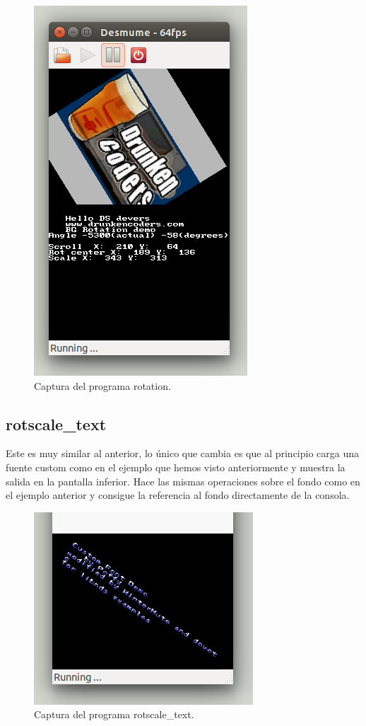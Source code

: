 \documentclass[12pt,english]{article}
\begin{document}
    \begin{figure}[H] 
    \centering
    \includegraphics[scale=0.5]{p3Media/rotation}
    \caption{Captura del programa rotation.}
    \end{figure}

    \newpage

    \subsection{rotscale\_text}

    Este es muy similar al anterior, lo único que cambia es que al principio carga una fuente custom como en el ejemplo que hemos visto anteriormente y muestra la salida en la pantalla inferior. Hace las mismas operaciones sobre el fondo como en el ejemplo anterior y consigue la referencia al fondo directamente de la consola. 

    \begin{figure}[H] 
    \centering
    \includegraphics[scale=0.5]{p3Media/rotscale_text}
    \caption{Captura del programa rotscale\_text.}
    \end{figure}
\end{document}
